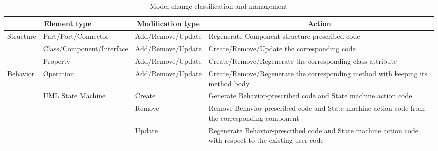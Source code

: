 \begin{table}[]
	\scriptsize
	\centering
	\caption{Model change classification and management}
	\label{table:modelchangeclassification}
	\begin{tabular}{|l|p{3cm}|l|p{9.5cm}|}
		\hline
		\multicolumn{2}{|c|}{Element type}                              & \multicolumn{1}{c|}{Modification type} & \multicolumn{1}{c|}{Action}                                                                              \\ \hline
		\multirow{3}{*}{Structure} & Part/Port/Connector                & Add/Remove/Update                      & Regenerate Component structure-prescribed code                                                           \\ \cline{2-4} 
		& Class/Component/Interface          & Add/Remove/Update                      & Create/Remove/Update the corresponding code                                                              \\ \cline{2-4} 
		& Property                           & Add/Remove/Update                      & Create/Remove/Regenerate the corresponding class attribute                                               \\ \hline
		\multirow{4}{*}{Behavior}  & Operation                          & Add/Remove/Update                      & Create/Remove/Regenerate the corresponding method with keeping its method body                           \\ \cline{2-4} 
		& \multirow{3}{*}{UML State Machine} & Create                                 & Generate Behavior-prescribed code and State machine action code                                          \\ \cline{3-4} 
		&                                    & Remove                                 & Remove Behavior-prescribed code and State machine action code from the corresponding component           \\ \cline{3-4} 
		&                                    & Update                                 & Regenerate Behavior-prescribed code and State machine action code with respect to the existing user-code \\
		\hline
	\end{tabular}
\end{table}

